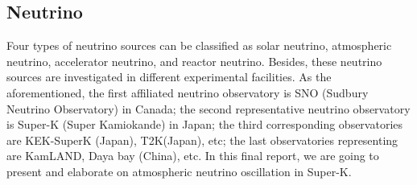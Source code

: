 \documentclass[12pt]{article}
\begin{document}
\setlength{\columnsep}{0.03\textwidth}
\begin{multicols}{2}
\thispagestyle{fancy}

\section{Neutrino}
    Four types of neutrino sources can be classified as solar neutrino, atmospheric neutrino, accelerator neutrino, and reactor neutrino. Besides, these neutrino sources are investigated in different experimental facilities. As the aforementioned, the first affiliated neutrino observatory is SNO (Sudbury Neutrino Observatory) in Canada; the second representative neutrino observatory is Super-K (Super Kamiokande) in Japan; the third corresponding observatories are KEK-SuperK (Japan), T2K(Japan), etc; the last observatories representing are KamLAND, Daya bay (China), etc. In this final report, we are going to present and elaborate on atmospheric neutrino oscillation in Super-K.


\end{multicols}
\end{document}

